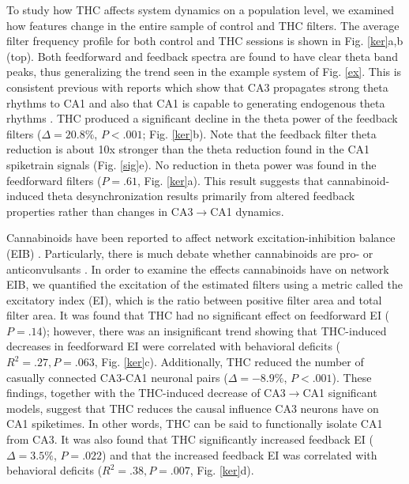 \documentclass[11pt,a4paper,final]{article}
\begin{document}
To study how THC affects system dynamics on a population level, we examined how features change in the entire sample of control and THC filters.
The average filter frequency profile for both control and THC sessions is shown in Fig. \ref{ker}a,b (top).
Both feedforward and feedback spectra are found to have clear theta band peaks, thus generalizing the trend seen in the example system of Fig. \ref{ex}.
This is consistent previous with reports which show that CA3 propagates strong theta rhythms to CA1 \citep{kocsis99,buzsaki02} and also that CA1 is capable to generating endogenous theta rhythms \citep{williams09}.
THC produced a significant decline in the theta power of the feedback filters ($\Delta=20.8\%$, $P<.001$; Fig. \ref{ker}b).
Note that the feedback filter theta reduction is about 10x stronger than the theta reduction found in the CA1 spiketrain signals (Fig. \ref{sig}e).
No reduction in theta power was found in the feedforward filters ($P=.61$, Fig. \ref{ker}a).
This result suggests that cannabinoid-induced theta desynchronization results primarily from altered feedback properties rather than changes in CA3$\to$CA1 dynamics.

Cannabinoids have been reported to affect network excitation-inhibition balance (EIB) \citep{ozaita12,monory15}.
Particularly, there is much debate whether cannabinoids are pro- or anticonvulsants \citep{hill13,turkanis82,clement03,blair06,rudenko12}.
In order to examine the effects cannabinoids have on network EIB, we quantified the excitation of the estimated filters using a metric called the excitatory index (EI), which is the ratio between positive filter area and total filter area.
It was found that THC had no significant effect on feedforward EI ($P=.14$); however, there was an insignificant trend showing that THC-induced decreases in feedforward EI were correlated with behavioral deficits ($R^2=.27, P=.063$, Fig. \ref{ker}c).
Additionally, THC reduced the number of casually connected CA3-CA1 neuronal pairs ($\Delta=-8.9\%$, $P<.001$).
These findings, together with the THC-induced decrease of CA3$\to$CA1 significant models, suggest that THC reduces the causal influence CA3 neurons have on CA1 spiketimes.
In other words, THC can be said to functionally isolate CA1 from CA3.
It was also found that THC significantly increased feedback EI ($\Delta=3.5\%$, $P=.022$) and that the increased feedback EI was correlated with behavioral deficits ($R^2=.38, P=.007$, Fig. \ref{ker}d).
\end{document}
